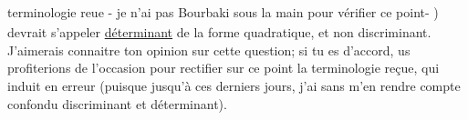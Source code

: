 
terminologie reu\textsubscript{\unsure{,}}e  - je n'ai pas Bourbaki sous la main pour vérifier ce
point- ) devrait s'appeler \uline{déterminant} de la forme quadratique, et non
discriminant. J'aimerais connaitre ton opinion sur cette question; si
tu es d'accord, us profiterions de l'occasion pour rectifier sur ce
point la terminologie reçue, qui induit en erreur (puisque jusqu'à ces
derniers jours, j'ai sans m'en rendre compte confondu discriminant et
déterminant).

